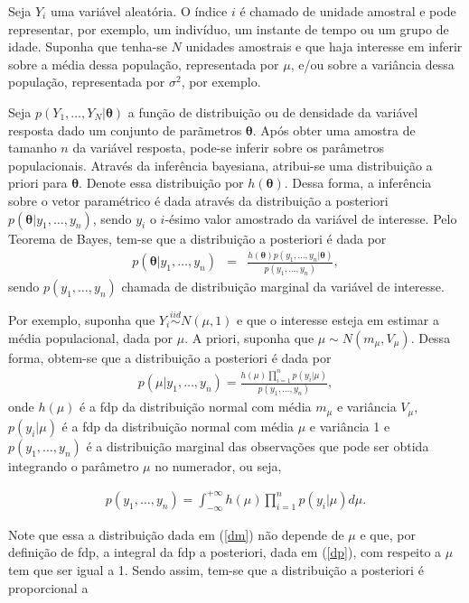 \documentclass[12pt,a4paper,header]{abnt}
\def\bs{\boldsymbol}
\begin{document}
Seja $Y_i$ uma variável aleatória. O índice $i$ é chamado de unidade amostral e pode representar, por exemplo, um indivíduo, um instante de tempo ou um grupo de idade. Suponha que tenha-se $N$ unidades amostrais e que haja interesse em inferir sobre a média dessa população, representada por $\mu$, e/ou sobre a variância dessa população, representada por $\sigma^2$, por exemplo.

Seja $p(Y_1, \ldots, Y_N|\bs{\theta})$ a função de distribuição ou de densidade da variável resposta dado um conjunto de parãmetros $\bs{\theta}$. Após obter uma amostra de tamanho $n$ da variável resposta, pode-se inferir sobre os parâmetros populacionais. Através da inferência bayesiana, atribui-se uma distribuição a priori para $\bs{\theta}$. Denote essa distribuição por $h(\bs{\theta})$. Dessa forma, a inferência sobre o vetor paramétrico é dada através da distribuição a posteriori $p(\bs{\theta}|y_1, \ldots, y_n)$, sendo $y_i$ o $i$-ésimo valor amostrado da variável de interesse. Pelo Teorema de Bayes, tem-se que a distribuição a posteriori é dada por
\begin{eqnarray}
	p(\bs{\theta}|y_1, \ldots, y_n) &=& \frac{h(\bs{\theta})p(y_1, \ldots, y_n|\bs{\theta}) }{p(y_1, \ldots, y_n)},\label{distpost}
\end{eqnarray}
sendo $p(y_1, \ldots, y_n)$ chamada de distribuição marginal da variável de interesse.

Por exemplo, suponha que $Y_i \stackrel{iid}{\sim} N\left( \mu, 1\right)$ e que o interesse esteja em estimar a média populacional, dada por $\mu$. A priori, suponha que $\mu \sim N(m_\mu, V_\mu)$. Dessa forma, obtem-se que a distribuição a posteriori é dada por
\begin{eqnarray}
	p(\mu|y_1, \ldots, y_n) = \frac{h(\mu)\prod_{i=1}^n{p(y_i|\mu)}}{p(y_1, \ldots, y_n)}, \label{dp}
\end{eqnarray}
onde $h(\mu)$ é a \ac{fdp} da distribuição normal com média $m_\mu$ e variância $V_\mu$, $p(y_i|\mu)$ é a \ac{fdp} da distribuição normal com média $\mu$ e variância 1 e $p(y_1, \ldots, y_n)$ é a distribuição marginal das observações que pode ser obtida integrando o parâmetro $\mu$ no numerador, ou seja,

\begin{eqnarray}
	p(y_1, \ldots, y_n) = \int_{-\infty}^{+\infty}{h(\mu)\prod_{i=1}^n{p(y_i|\mu)} d\mu}.\label{dm}
\end{eqnarray}

Note que essa a distribuição dada em (\ref{dm}) não depende de $\mu$ e que, por definição de \ac{fdp}, a integral da \ac{fdp} a posteriori, dada em (\ref{dp}), com respeito a $\mu$ tem que ser igual a 1. Sendo assim, tem-se que a distribuição a posteriori é proporcional a
\end{document}
